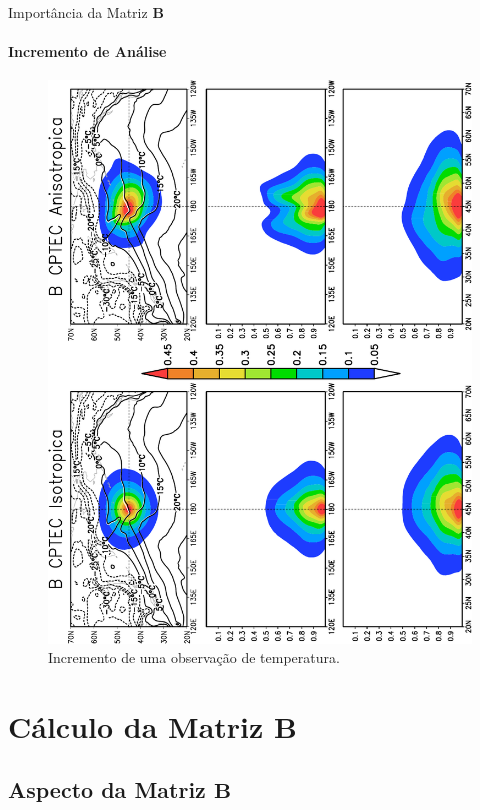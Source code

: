 \documentclass[10pt,aspectratio=169]{beamer}
\begin{document}
\begin{frame}[fragile]{Importância da Matriz $\mathbf{B}$}
\framesubtitle{Incremento de Análise}
  \vspace{-1.5em}
  \begin{figure}[H]
    \centering
    \includegraphics[trim={0.9cm 0 13cm 14.25cm},clip,scale=1.,angle=-90]{./figs/incr_anl_t1000_Bcptec-artigo_rbmet-crop.pdf}
    \caption{Incremento de uma observação de temperatura.}
  \end{figure}
\end{frame}

\section{Cálculo da Matriz $\mathbf{B}$}

\subsection{Aspecto da Matriz $\mathbf{B}$}
\end{document}
